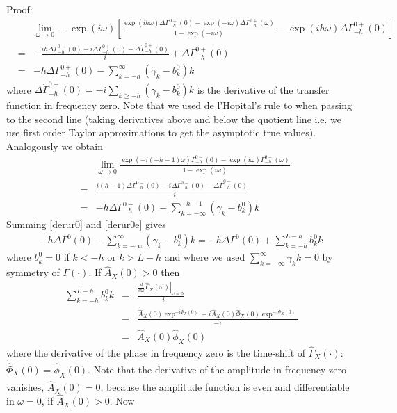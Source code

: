 \documentclass[11pt]{article}
\begin{document}
\begin{appendix}
Proof:\\
\begin{eqnarray}
&&\lim_{\omega\to 0}-\exp(i\omega)\left[\frac{\exp(ih\omega)\Delta\Gamma_{-h}^{0+}(0)-\exp(-i\omega)\Delta\Gamma_{-h}^{0+}(\omega)}{1-\exp(-i\omega)}-\exp(ih\omega)\Delta\Gamma_{-h}^{0+}(0)\right]\nonumber\\
&=&-\frac{ih\Delta\Gamma_{-h}^{0+}(0)+i\Delta\Gamma_{-h}^{0+}(0)-\Delta\dot{\Gamma}_{-h}^{0+}(0)}{i}+\Delta\Gamma_{-h}^{0+}(0)\nonumber\\
&=&-h\Delta{\Gamma}_{-h}^{0+}(0)-\sum_{k=-h}^\infty(\gamma_k-b_k^0)k\label{derur0}
\end{eqnarray}
where $\Delta\dot{\Gamma}_{-h}^{0+}(0)=-i\sum_{k\geq -h}(\gamma_k-b_k^0)k$ is the derivative of the transfer function in frequency zero. Note that we used de l'Hopital's rule to when passing to the second line (taking derivatives above and below the quotient line i.e. we use first order Taylor approximations to get the asymptotic true values). Analogously we obtain
\begin{eqnarray}
&&\lim_{\omega\to 0}\frac{\exp(-i(-h-1)\omega)\Gamma_{-h}^{0-}(0)-\exp(i\omega)\Gamma_{-h}^{0-}(\omega)}{1-\exp(i\omega)}\nonumber\\
&=&\frac{i(h+1)\Delta\Gamma_{-h}^{0-}(0)-i\Delta\Gamma_{-h}^{0-}(0)-\Delta\dot{\Gamma}_{-h}^{0-}(0)}{-i}\nonumber\\
&=&-h\Delta{\Gamma}_{-h}^{0-}(0)-\sum_{k=-\infty}^{-h-1}(\gamma_k-b_k^0)k \label{derur0e}
\end{eqnarray}
Summing \ref{derur0} and \ref{derur0e} gives
\begin{eqnarray*}
-h\Delta{\Gamma}^{0}(0)-\sum_{k=-\infty}^{\infty}(\gamma_k-b_k^0)k=-h\Delta{\Gamma}^{0}(0)+\sum_{k=-h}^{L-h}b_k^0k
\end{eqnarray*}
where $b_k^0=0$ if $k<-h$ or $k>L-h$ and where we used $\sum_{k=-\infty}^{\infty}\gamma_k k=0$ by symmetry of $\Gamma(\cdot)$.
If $\hat{A}_X(0)>0$ then
\begin{eqnarray*}
\sum_{k=-h}^{L-h}b_k^0k&=&\frac{\left.\frac{d}{d\omega}\hat{\Gamma}_X(\omega)\right|_{\omega=0}}{-i}\\
&=&\frac{\dot{\hat{A}}_X(0)\exp^{-i\hat{\Phi}_X(0)}-i \hat{A}_X(0)\dot{\hat{\Phi}}_X(0)\exp^{-i\hat{\Phi}_X(0)}}{-i}\\
&=&\hat{A}_X(0) \hat{\phi}_X(0)
\end{eqnarray*}
where the derivative of the phase in frequency zero is the time-shift of $\hat{\Gamma}_X(\cdot)$: $\dot{\hat{\Phi}}_X(0)=\hat{\phi}_X(0)$. Note that the derivative of the amplitude in frequency zero vanishes, $\dot{\hat{A}}_X(0)=0$,  because the amplitude function is even and differentiable in $\omega=0$, if $\hat{A}_X(0)>0$. Now

\end{appendix}
\end{document}
